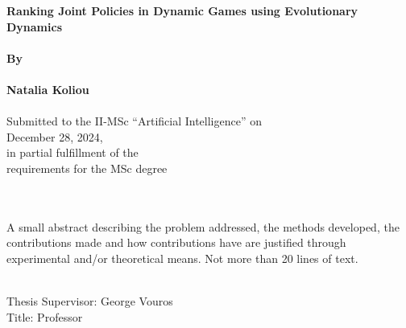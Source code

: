\begin{center}
    \Large{\textbf{Ranking Joint Policies in Dynamic Games using Evolutionary Dynamics}} \\~\\
    \Large{\textbf{By}} \\~\\
    \Large{\textbf{Natalia Koliou}} \\~\\
    
    \large{Submitted to the II-MSc “Artificial Intelligence” on \\ December 28, 2024, \\ in partial fulfillment of the \\ requirements for the MSc degree \\~\\}
\end{center}

\renewenvironment{abstract}
 {\par\noindent\textbf{\abstractname}\ \ignorespaces}
 {\par\medskip}

\begin{abstract}
    \\ A small abstract describing the problem addressed, the methods developed, the contributions made and how contributions have are justified through experimental and/or theoretical means. 
    Not more than 20 lines of text. \\~\\
    
    \begin{flushleft}
        Thesis Supervisor:  George Vouros\\
        Title: Professor\\
    \end{flushleft}
\end{abstract}